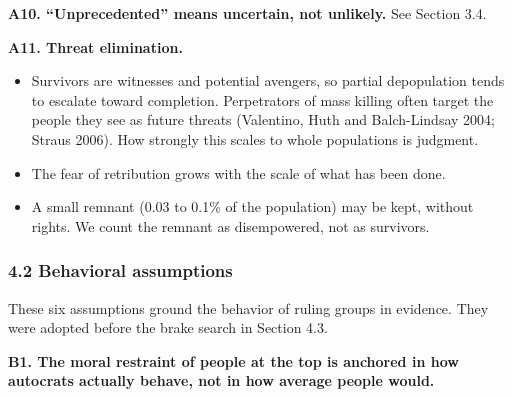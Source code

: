 \documentclass[
  10pt,
]{article}
\providecommand{\tightlist}{%
  \setlength{\itemsep}{0pt}\setlength{\parskip}{0pt}}
\begin{document}
\textbf{A10. ``Unprecedented'' means uncertain, not unlikely.} See Section 3.4.

\textbf{A11. Threat elimination.}

\begin{itemize}
\tightlist
\item
  Survivors are witnesses and potential avengers, so partial depopulation tends to escalate toward
  completion. Perpetrators of mass killing often target the people they see as future threats
  (Valentino, Huth and Balch-Lindsay 2004; Straus 2006). How strongly this scales to whole
  populations is judgment.
\item
  The fear of retribution grows with the scale of what has been done.
\item
  A small remnant (0.03 to 0.1\% of the population) may be kept, without rights. We count the
  remnant as disempowered, not as survivors.
\end{itemize}

\subsubsection{4.2 Behavioral assumptions}\label{behavioral-assumptions}

These six assumptions ground the behavior of ruling groups in evidence. They were adopted before the
brake search in Section 4.3.

\textbf{B1. The moral restraint of people at the top is anchored in how autocrats actually behave,
not in how average people would.}
\end{document}
